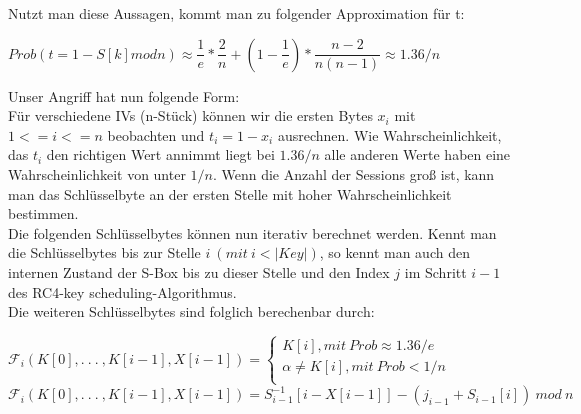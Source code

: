 \documentclass[10pt,a4paper]{article}
\begin{document}
Nutzt man diese Aussagen, kommt man zu folgender Approximation für t:
\begin{center}
$Prob( t = 1 - S[k] mod n) \approx \dfrac{1}{e} * \dfrac{2}{n} + ( 1- \dfrac{1}{e}) * \dfrac{n-2}{n(n-1)} \approx 1.36/n$
\end{center}
Unser Angriff hat nun folgende Form:\\
Für verschiedene IVs (n-Stück) können wir die ersten Bytes $x_i$ mit $1 <= i <= n$ beobachten und $t_i = 1 - x_i$ ausrechnen. Wie Wahrscheinlichkeit, das $t_i$ den richtigen Wert annimmt liegt bei $1.36/n$ alle anderen Werte haben eine Wahrscheinlichkeit von unter $1/n$. Wenn die Anzahl der Sessions groß ist, kann man das Schlüsselbyte an der ersten Stelle mit hoher Wahrscheinlichkeit bestimmen.\\
Die folgenden Schlüsselbytes können nun iterativ berechnet werden. Kennt man die Schlüsselbytes bis zur Stelle $i\ ( mit\  i < |Key|)$, so kennt man auch den internen Zustand der S-Box bis zu dieser Stelle und den Index $j$ im Schritt $i - 1$ des RC4-\glqq key scheduling\grqq -Algorithmus. \\
Die weiteren Schlüsselbytes sind folglich berechenbar durch:
\begin{center}
$\mathcal{F}_i(K[0], .\ .\ .\ ,K[i-1],X[i-1]) = \begin{cases} K[i], mit \ Prob \approx 1.36/e \\ \alpha \neq K[i], mit \ Prob < 1/n \\\end{cases}$
\\\vspace{1em}
$\mathcal{F}_i(K[0], .\ .\ .\ ,K[i-1],X[i-1]) = S^{-1}_{i-1}[i-X[i-1]] - (j_{i-1}+S_{i-1}[i]) \ mod \ n$
\end{center}
\end{document}
